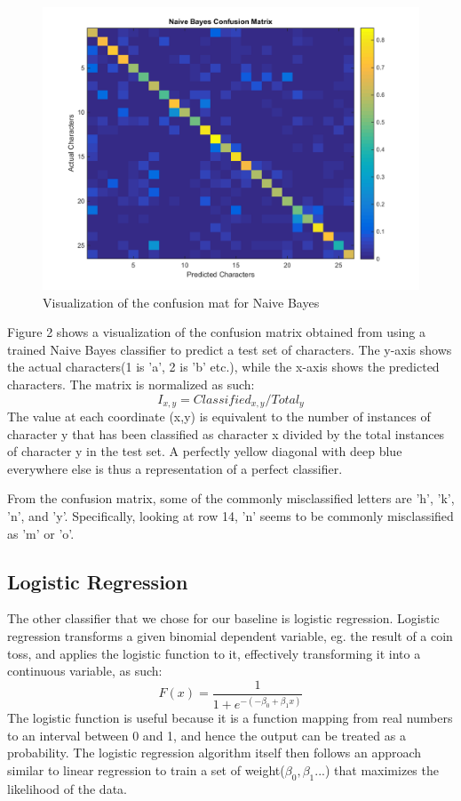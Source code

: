 \documentclass{article} %
\begin{document}
\begin{figure}[h]
\begin{center}
\includegraphics[scale=0.4]{confusion_nb.png}
\end{center}
\caption{Visualization of the confusion mat for Naive Bayes}
\end{figure}

Figure 2 shows a visualization of the confusion matrix obtained from using a trained Naive Bayes classifier to predict a test set of characters. The y-axis shows the actual characters(1 is 'a', 2 is 'b' etc.), while the x-axis shows the predicted characters. The matrix is normalized as such:
$$I_{x, y} = Classified_{x, y}/Total_{y}$$
The value at each coordinate (x,y) is equivalent to the number of instances of character y that has been classified as character x divided by the total instances of character y in the test set. A perfectly yellow diagonal with deep blue everywhere else is thus a representation of a perfect classifier.

From the confusion matrix, some of the commonly misclassified letters are 'h', 'k', 'n', and 'y'. Specifically, looking at row 14, 'n' seems to be commonly misclassified as 'm' or 'o'. 

\subsection{Logistic Regression}
The other classifier that we chose for our baseline is logistic regression.
Logistic regression transforms a given binomial dependent variable, eg. the result of a coin toss, and applies the logistic function to it, effectively transforming it into a continuous variable, as such:
$$F(x) = \frac{1}{1+e^{-(-\beta_0 + \beta_1x)}}$$
The logistic function is useful because it is a function mapping from real numbers to an interval between 0 and 1, and hence the output can be treated as a probability. The logistic regression algorithm itself then follows an approach similar to linear regression to train a set of weight($\beta_0, \beta_1...$) that maximizes the likelihood of the data.
\end{document}
